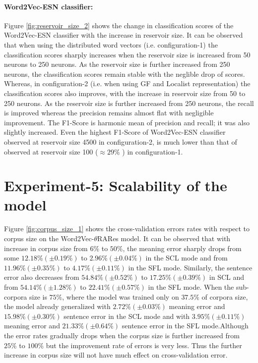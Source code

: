 \paragraph{Word2Vec-ESN classifier: } Figure \ref{fig:reservoir_size_2} shows the change in classification scores of the Word2Vec-ESN classifier with the increase in reservoir size. It can be observed that when using the distributed word vectors (i.e. configuration-1) the classification scores sharply increases when the reservoir size is increased from 50 neurons to 250 neurons. As the reservoir size is further increased from 250 neurons, the classification scores remain stable with the neglible drop of scores. Whereas, in configuration-2 (i.e. when using GF and Localist representation) the classification scores also improves, with the increase in reservoir size from 50 to 250 neurons. As the reservoir size is further increased from 250 neurons, the recall is improved whereas the precision remains almost flat with negligible improvement. The F1-Score is harmonic mean of precision and recall; it was also slightly increased. Even the highest F1-Score of Word2Vec-ESN classifier observed at reservoir size 4500 in configuration-2, is much lower than that of observed at reservoir size 100 ($\approx 29 \%$ ) in configuration-1.

\section{Experiment-5: Scalability of the model}

Figure \ref{fig:corpus_size_1} shows the cross-validation errors rates with respect to corpus size on the Word2Vec-$\theta$RARes model. It can be observed that with increase in corpus size from $6 \%$  to $50 \%$, the meaning error sharply drops from some $12.18 \% (\pm 0.19 \%)$ to $2.96 \%(\pm 0.04\%)$ in the SCL mode and from $11.96\%(\pm 0.35\%)$ to $4.17 \%(\pm 0.11\%)$ in the SFL mode. Similarly, the sentence error also decreases from $54.84 \%(\pm 0.52\%)$ to $17.25 \%(\pm 0.39\%)$ in SCL and from $54.14 \%(\pm 1.28\%)$ to $22.41 \% (\pm 0.57\%)$ in the SFL mode. When the sub-corpora size is $75\%$, where the model was trained only on $37.5\%$ of corpora size, the model already generalized with $2.72 \%(\pm 0.03\%)$ meaning error and $15.98 \% (\pm 0.30\%)$ sentence error in the SCL mode and with $3.95 \%(\pm 0.11\%)$ meaning error and $21.33 \%(\pm 0.64\%)$ sentence error in the SFL mode.Although the error rates gradually drops when the corpus size is further increased from $25\%$ to $100\%$ but the improvement rate of errors is very less. Thus the further increase in corpus size will not have much effect on cross-validation error.

